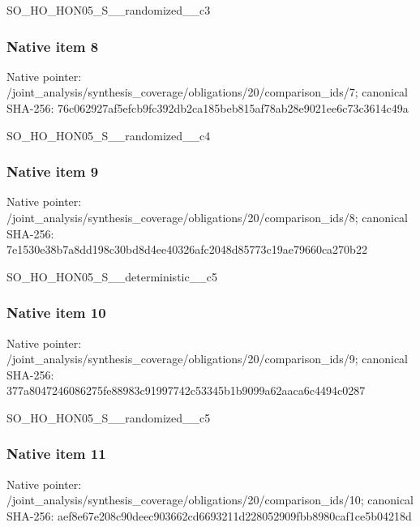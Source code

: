 \documentclass[10pt,a4paper]{article}
\begin{document}
\begingroup\raggedright\sloppy SO\_\allowbreak{}HO\_\allowbreak{}HON05\_\allowbreak{}S\_\allowbreak{}\_\allowbreak{}randomized\_\allowbreak{}\_\allowbreak{}c3\par\endgroup

\subsubsection{Native item 8}
Native pointer: /joint\_\allowbreak{}analysis/synthesis\_\allowbreak{}coverage/obligations/20/comparison\_\allowbreak{}ids/7; canonical SHA-256: 76c062927af5efcb9fc392db2ca185beb815af78ab28e9021ee6c73c3614c49a

\begingroup\raggedright\sloppy SO\_\allowbreak{}HO\_\allowbreak{}HON05\_\allowbreak{}S\_\allowbreak{}\_\allowbreak{}randomized\_\allowbreak{}\_\allowbreak{}c4\par\endgroup

\subsubsection{Native item 9}
Native pointer: /joint\_\allowbreak{}analysis/synthesis\_\allowbreak{}coverage/obligations/20/comparison\_\allowbreak{}ids/8; canonical SHA-256: 7e1530e38b7a8dd198c30bd8d4ee40326afc2048d85773c19ae79660ca270b22

\begingroup\raggedright\sloppy SO\_\allowbreak{}HO\_\allowbreak{}HON05\_\allowbreak{}S\_\allowbreak{}\_\allowbreak{}deterministic\_\allowbreak{}\_\allowbreak{}c5\par\endgroup

\subsubsection{Native item 10}
Native pointer: /joint\_\allowbreak{}analysis/synthesis\_\allowbreak{}coverage/obligations/20/comparison\_\allowbreak{}ids/9; canonical SHA-256: 377a8047246086275fe88983c91997742c53345b1b9099a62aaca6c4494c0287

\begingroup\raggedright\sloppy SO\_\allowbreak{}HO\_\allowbreak{}HON05\_\allowbreak{}S\_\allowbreak{}\_\allowbreak{}randomized\_\allowbreak{}\_\allowbreak{}c5\par\endgroup

\subsubsection{Native item 11}
Native pointer: /joint\_\allowbreak{}analysis/synthesis\_\allowbreak{}coverage/obligations/20/comparison\_\allowbreak{}ids/10; canonical SHA-256: aef8e67e208c90deec903662cd6693211d228052909fbb8980caf1ce5b04218d
\end{document}
